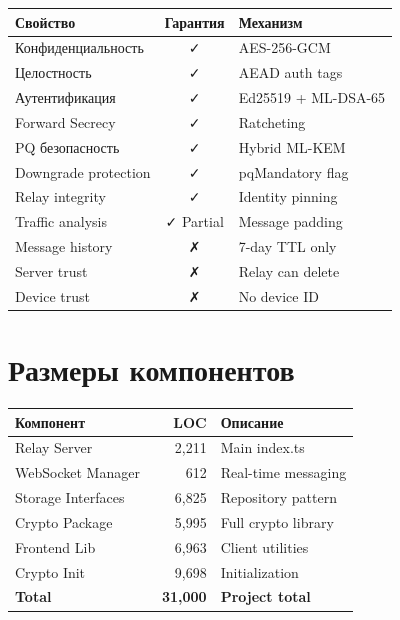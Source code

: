 \documentclass[11pt,a4paper,oneside]{book}
\begin{document}
\begin{table}[h]
\centering
\begin{tabular}{|p{4cm}|c|p{5cm}|}
\hline
\textbf{Свойство} & \textbf{Гарантия} & \textbf{Механизм} \\
\hline
Конфиденциальность & ✓ & AES-256-GCM \\
\hline
Целостность & ✓ & AEAD auth tags \\
\hline
Аутентификация & ✓ & Ed25519 + ML-DSA-65 \\
\hline
Forward Secrecy & ✓ & Ratcheting \\
\hline
PQ безопасность & ✓ & Hybrid ML-KEM \\
\hline
Downgrade protection & ✓ & pqMandatory flag \\
\hline
Relay integrity & ✓ & Identity pinning \\
\hline
Traffic analysis & ✓ Partial & Message padding \\
\hline
Message history & ✗ & 7-day TTL only \\
\hline
Server trust & ✗ & Relay can delete \\
\hline
Device trust & ✗ & No device ID \\
\hline
\end{tabular}
\end{table}
\vspace{-0.5cm}\chapter{Размеры компонентов}
\begin{table}[h]
\centering
\begin{tabular}{|l|r|l|}
\hline
\textbf{Компонент} & \textbf{LOC} & \textbf{Описание} \\
\hline
Relay Server & 2,211 & Main index.ts \\
\hline
WebSocket Manager & 612 & Real-time messaging \\
\hline
Storage Interfaces & 6,825 & Repository pattern \\
\hline
Crypto Package & 5,995 & Full crypto library \\
\hline
Frontend Lib & 6,963 & Client utilities \\
\hline
Crypto Init & 9,698 & Initialization \\
\hline
\textbf{Total} & \textbf{~31,000} & \textbf{Project total} \\
\hline
\end{tabular}
\end{table}
\end{document}
